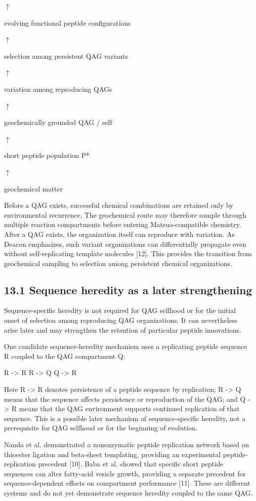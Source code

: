 \documentclass[11pt]{article}
\begin{document}
$\uparrow$

evolving functional peptide configurations

$\uparrow$

selection among persistent QAG variants

$\uparrow$

variation among reproducing QAGs

$\uparrow$

geochemically grounded QAG / self

$\uparrow$

short peptide population P*

$\uparrow$

geochemical matter

Before a QAG exists, successful chemical combinations are retained only by environmental recurrence. The geochemical route may therefore sample through multiple reaction compartments before entering Matsuo-compatible chemistry. After a QAG exists, the organization itself can reproduce with variation. As Deacon emphasizes, such variant organizations can differentially propagate even without self-replicating template molecules {[}12{]}. This provides the transition from geochemical sampling to selection among persistent chemical organizations.

\subsection*{13.1 Sequence heredity as a later strengthening}

Sequence-specific heredity is not required for QAG selfhood or for the initial onset of selection among reproducing QAG organizations. It can nevertheless arise later and may strengthen the retention of particular peptide innovations.

One candidate sequence-heredity mechanism uses a replicating peptide sequence R coupled to the QAG compartment Q:

R -\textgreater{} R R -\textgreater{} Q Q -\textgreater{} R

Here R -\textgreater{} R denotes persistence of a peptide sequence by replication; R -\textgreater{} Q means that the sequence affects persistence or reproduction of the QAG; and Q -\textgreater{} R means that the QAG environment supports continued replication of that sequence. This is a possible later mechanism of sequence-specific heredity, not a prerequisite for QAG selfhood or for the beginning of evolution.

Nanda et al. demonstrated a nonenzymatic peptide replication network based on thioester ligation and beta-sheet templating, providing an experimental peptide-replication precedent {[}10{]}. Baba et al. showed that specific short peptide sequences can alter fatty-acid vesicle growth, providing a separate precedent for sequence-dependent effects on compartment performance {[}11{]}. These are different systems and do not yet demonstrate sequence heredity coupled to the same QAG.
\end{document}
